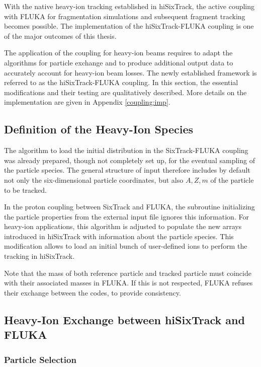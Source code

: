 With the native heavy-ion tracking established in hiSixTrack, the active coupling with FLUKA for fragmentation simulations and subsequent fragment tracking becomes possible. The implementation of the hiSixTrack-FLUKA coupling is one of the major outcomes of this thesis. 

The application of the coupling for heavy-ion beams requires to adapt the algorithms for particle exchange and to produce  additional output data to accurately account for heavy-ion beam losses. The newly established framework is referred to as the hiSixTrack-FLUKA coupling. In this section, the essential modifications and their testing are qualitatively described. More details on the implementation are given in Appendix \ref{coupling:imp}.




\subsection{Definition of the Heavy-Ion Species}

The algorithm to load the initial distribution in the SixTrack-FLUKA coupling was already prepared, though not completely set up, for the eventual sampling of the particle species. The general structure of input therefore includes by default not only the six-dimensional particle coordinates, but also $A,Z,m$ of the particle to be tracked.

In the proton coupling between SixTrack and FLUKA, the subroutine initializing the particle properties from the external input file ignores this information. For heavy-ion applications, this algorithm is adjusted to populate the new arrays introduced in hiSixTrack with information about the particle species. This modification allows to load an initial bunch of user-defined ions to perform the tracking in hiSixTrack. 

Note that the mass of both reference particle and tracked particle must coincide with their associated masses in FLUKA. If this is not respected, FLUKA refuses their exchange between the codes, to provide consistency.


\subsection{Heavy-Ion Exchange between hiSixTrack and FLUKA}

\subsubsection{Particle Selection}


